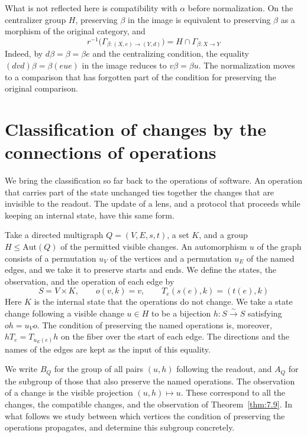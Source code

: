 What is not reflected here is compatibility with $\alpha$ before normalization.
On the centralizer group $H$, preserving $\beta$ in the image is equivalent to preserving
$\beta$ as a morphism of the original category, and
\begin{equation*}
r^{-1}\bigl(\Gamma_{\beta:(X,e)\to(Y,d)}\bigr)
=H\cap\Gamma_{\beta:X\to Y}
\tag{7.36}\label{eq:7.36}
\end{equation*}
Indeed, by $d\beta=\beta=\beta e$ and the centralizing condition, the equality
$(dvd)\beta=\beta(eue)$ in the image reduces to $v\beta=\beta u$.
The normalization moves to a comparison that has forgotten part of the condition for
preserving the original comparison.

\section{Classification of changes by the connections of operations}\label{sec:7.7}

We bring the classification so far back to the operations of software.
An operation that carries part of the state unchanged ties together the changes that are
invisible to the readout.
The update of a lens, and a protocol that proceeds while keeping an internal state, have
this same form.

\begin{definition}\label{def:7.23}

Take a directed multigraph $Q=(V,E,s,t)$, a set $K$, and a group
$H\le\mathrm{Aut}(Q)$ of the permitted visible changes.
An automorphism $u$ of the graph consists of a permutation $u_V$ of the vertices and a
permutation $u_E$ of the named edges, and we take it to preserve starts and ends.
We define the states, the observation, and the operation of each edge by
\begin{equation*}
S=V\times K,\qquad o(v,k)=v,\qquad
T_e(s(e),k)=(t(e),k)
\tag{7.37}\label{eq:7.37}
\end{equation*}
Here $K$ is the internal state that the operations do not change.
We take a state change following a visible change $u\in H$ to be a bijection
$h:S\xrightarrow{\sim}S$ satisfying $oh=u_Vo$.
The condition of preserving the named operations is, moreover, $hT_e=T_{u_E(e)}h$ on the
fiber over the start of each edge.
The directions and the names of the edges are kept as the input of this equality.

We write $B_Q$ for the group of all pairs $(u,h)$ following the readout, and $A_Q$ for the
subgroup of those that also preserve the named operations.
The observation of a change is the visible projection $(u,h)\mapsto u$.
These correspond to all the changes, the compatible changes, and the observation of
Theorem~\ref{thm:7.9}.
In what follows we study between which vertices the condition of preserving the operations
propagates, and determine this subgroup concretely.

\end{definition}

